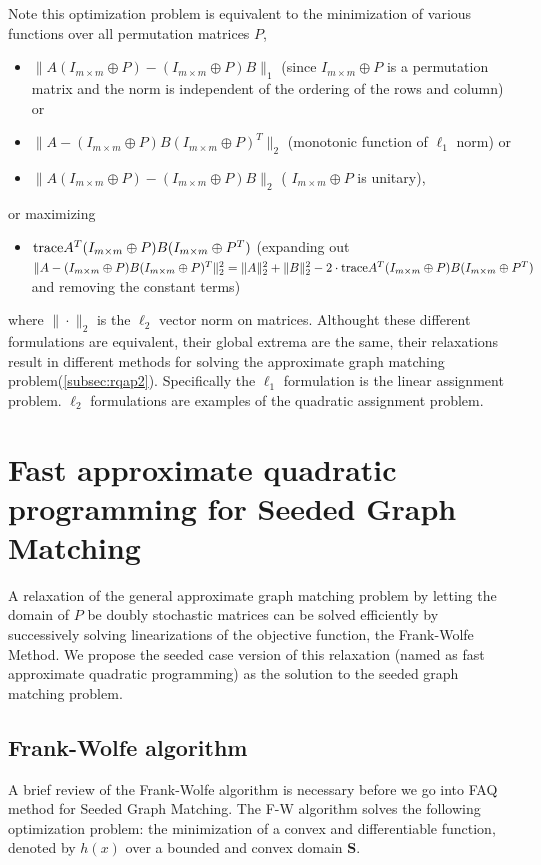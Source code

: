 \documentclass[12pt,oneside,final]{thesis}
\begin{document}
   
 Note this optimization problem is equivalent to the minimization of various functions over all permutation matrices $P$,  \eg
 \begin{itemize}
\item $\|A(I_{m \times m}\oplus P)-(I_{m \times m}\oplus P)B\|_1$ (since $I_{m \times m}\oplus P$ is a permutation matrix and the norm is independent of the ordering of the rows and column) or
\item $\|A-(I_{m \times m}\oplus P)B(I_{m \times m}\oplus P)^T\|_2$ (monotonic function of $\ell_1$ norm) or
\item  $\|A(I_{m \times m}\oplus P)-(I_{m \times m}\oplus P)B\|_2$ ( $I_{m \times m}\oplus P$ is unitary), 
 \end{itemize}
or maximizing 
\begin{itemize}
\item $\textup{trace} {A^T(I_{m \times m}\oplus P)B(I_{m \times m}\oplus P^T)}$ (expanding out $\|A-(I_{m \times m}\oplus P)B(I_{m \times m}\oplus P)^T\|_2^2=
\|A\|_2^2 + \|B\|_2^2
- 2 \cdot \textup{trace}{A^T(I_{m \times m}\oplus P)B(I_{m \times m}\oplus P^T)}$  and removing the constant terms) \label{item:squareofdist_eq_tr_crossprod}
\end{itemize}

where $\| \cdot \|_2$ is the $\ell_2$ vector norm on matrices.   Althought these different formulations  are equivalent, \ie  their global extrema are the same, their relaxations result in different methods for solving the approximate graph matching problem(\autoref{subsec:rqap2}). Specifically the $\ell_1$ formulation is the  linear assignment problem. $\ell_2$ formulations are examples of the quadratic assignment problem.

 
\section{Fast approximate quadratic programming for Seeded Graph Matching}


A relaxation of the general   approximate graph matching problem by letting the  domain of $P$ be doubly stochastic matrices can be solved efficiently by successively solving linearizations of the objective function, the Frank-Wolfe Method. We propose the seeded case version of this relaxation (named as fast approximate quadratic programming)  as the solution to the seeded graph matching problem.
\subsection{Frank-Wolfe algorithm}
A brief review of the Frank-Wolfe algorithm is necessary before we go into FAQ method for Seeded Graph Matching. The F-W algorithm solves the following optimization problem: the minimization of a convex and differentiable function, denoted by $h(x)$ 
over a bounded and convex domain $\mathbf{S}$. 
\end{document}
